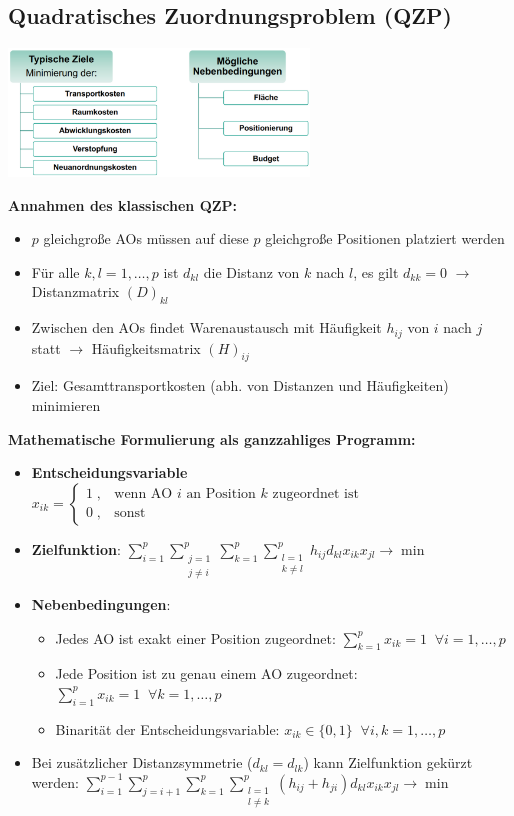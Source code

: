 \subsection{Quadratisches Zuordnungsproblem (QZP)}
\begin{center}
	\includegraphics[width=0.6\textwidth]{images/goals.png}
\end{center}

\textbf{Annahmen des klassischen QZP:}
\begin{itemize}
	\item $p$ gleichgroße AOs müssen auf diese $p$ gleichgroße Positionen platziert werden
	\item Für alle $k,l=1,\ldots,p$ ist $d_{kl}$ die Distanz von $k$ nach $l$, es gilt $d_{kk}=0$ $\rightarrow$ Distanzmatrix $(D)_{kl}$
	\item Zwischen den AOs findet Warenaustausch mit Häufigkeit $h_{ij}$ von $i$ nach $j$ statt $\rightarrow$ Häufigkeitsmatrix $(H)_{ij}$
	\item Ziel: Gesamttransportkosten (abh. von Distanzen und Häufigkeiten) minimieren
\end{itemize}
\bigskip
\textbf{Mathematische Formulierung als ganzzahliges Programm:} 
\begin{itemize}
	\item \textbf{Entscheidungsvariable} $x_{ik}=
	\begin{cases}
		1\;, & \text{wenn AO } i \text{ an Position } k \text{ zugeordnet ist}\\
		0\;, & \text{sonst}
	\end{cases}$ 
	\item \textbf{Zielfunktion}: $\sum\limits_{i=1}^{p}\sum\limits_{\substack{j=1 \\ j\neq i}}^{p}\sum\limits_{k=1}^{p}\sum\limits_{\substack{l=1 \\ k\neq l}}^{p} h_{ij}d_{kl}x_{ik}x_{jl}\rightarrow\min$
	\item \textbf{Nebenbedingungen}: 
	\begin{itemize}
		\item Jedes AO ist exakt einer Position zugeordnet: $\sum\limits_{k=1}^{p}x_{ik}=1 \;\; \forall i=1,\ldots,p$
		\item Jede Position ist zu genau einem AO zugeordnet: $\sum\limits_{i=1}^{p}x_{ik}=1 \;\; \forall k=1,\ldots,p$
		\item Binarität der Entscheidungsvariable: $x_{ik}\in\{0,1\}\;\; \forall i,k=1,\ldots,p$
	\end{itemize}
	\item Bei zusätzlicher Distanzsymmetrie ($d_{kl}=d_{lk}$) kann Zielfunktion gekürzt werden: $\sum\limits_{i=1}^{p-1}\sum\limits_{j=i+1}^{p}\sum\limits_{k=1}^{p}\sum\limits_{\substack{l=1 \\ l\neq k}}^{p} (h_{ij}+h_{ji})d_{kl}x_{ik}x_{jl}\rightarrow\min$
\end{itemize}
